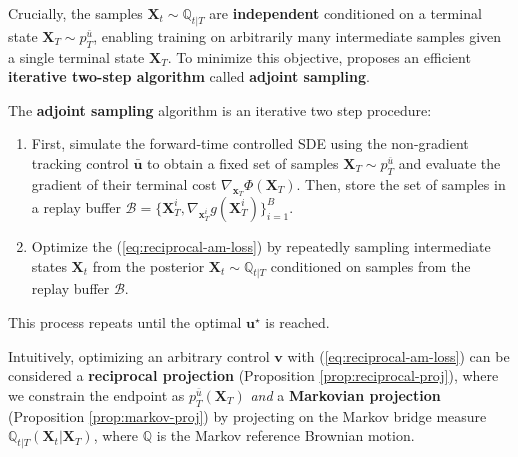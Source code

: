 \documentclass{article}
\newcommand{\purple}[2][]{%
  \begin{purplebox}[#1]
    #2
  \end{purplebox}
}
\newcommand{\boldtext}[1]{\textbf{\textcolor{MyGreen}{#1}}}
\begin{document}
Crucially, the samples $\boldsymbol{X}_t\sim \mathbb{Q}_{t|T}$ are \textbf{independent} conditioned on a terminal state $\boldsymbol{X}_T\sim p^{\bar{u}}_T$, enabling training on arbitrarily many intermediate samples given a single terminal state $\boldsymbol{X}_T$. To minimize this objective, \citet{havens2025adjoint} proposes an efficient \textbf{iterative two-step algorithm} called \boldtext{adjoint sampling}.

\purple[Adjoint Sampling Algorithm]{\label{alg:adjoint-sampling}
The \textbf{adjoint sampling} algorithm \citep{havens2025adjoint} is an iterative two step procedure:
\begin{enumerate}
    \item [(i)] First, simulate the forward-time controlled SDE using the non-gradient tracking control $\bar{\boldsymbol{u}}$ to obtain a fixed set of samples $\boldsymbol{X}_T\sim p^{\bar{u}}_T$ and evaluate the gradient of their terminal cost $\nabla_{\boldsymbol{x}_T}\Phi(\boldsymbol{X}_T)$. Then, store the set of samples in a replay buffer $\mathcal{B}=\{\boldsymbol{X}^i_T,\nabla_{\boldsymbol{x}^i_T}g(\boldsymbol{X}^i_T)\}_{i=1}^B$.
    \item [(ii)] Optimize the (\ref{eq:reciprocal-am-loss}) by repeatedly sampling intermediate states $\boldsymbol{X}_t$ from the posterior $\boldsymbol{X}_t\sim \mathbb{Q}_{t|T}$ conditioned on samples from the replay buffer $\mathcal{B}$. 
\end{enumerate}
This process repeats until the optimal $\boldsymbol{u}^\star$ is reached.
}

Intuitively, optimizing an arbitrary control $\boldsymbol{v}$ with (\ref{eq:reciprocal-am-loss}) can be considered a \textbf{reciprocal projection} (Proposition \ref{prop:reciprocal-proj}), where we constrain the endpoint as $p^{\bar{u}}_T(\boldsymbol{X}_T)$ \textit{and} a \textbf{Markovian projection} (Proposition \ref{prop:markov-proj}) by projecting on the Markov bridge measure $\mathbb{Q}_{t|T}(\boldsymbol{X}_t|\boldsymbol{X}_T)$, where $\mathbb{Q}$ is the Markov reference Brownian motion. 
\end{document}

